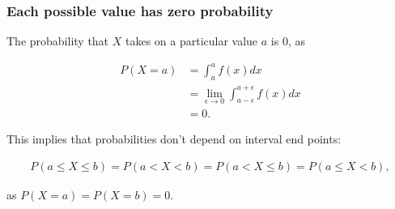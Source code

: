 \documentclass{beamer}
\begin{document}
\begin{frame}
\frametitle{Each possible value has zero probability}

The probability that $X$ takes on a particular value $a$ is 0, as 

\vspace{-0.25cm}

\begin{align*}
P(X = a) &= \int_a^a f(x) dx \\
&= \lim\limits_{\epsilon \to 0}  \int_{a-\epsilon}^{a+\epsilon} f(x) dx \\
&= 0.
\end{align*}

This implies that probabilities don't depend on interval end points:

\vspace{-0.25cm}

\begin{align*}
P(a \leq X \leq b) = P(a < X < b) = P(a < X \leq b) = P(a \leq X < b),
\end{align*}

as  $P(X = a) = P(X = b) = 0$.


\end{frame}
\end{document}
